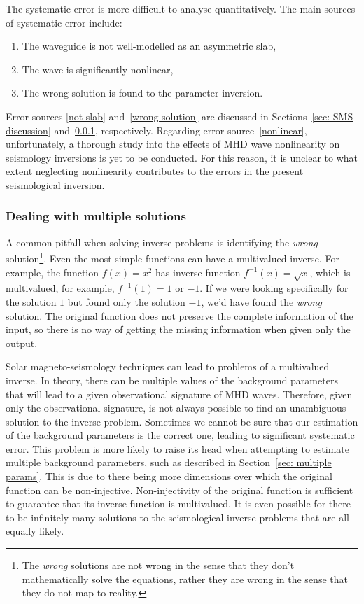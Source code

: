 The systematic error is more difficult to analyse quantitatively. The main sources of systematic error include:
\begin{enumerate}
	\item The waveguide is not well-modelled as an asymmetric slab, \label{not slab}
	\item The wave is significantly nonlinear, \label{nonlinear}
	\item The wrong solution is found to the parameter inversion. \label{wrong solution}
\end{enumerate}
Error sources \ref{not slab} and~\ref{wrong solution} are discussed in Sections~\ref{sec: SMS discussion} and~\ref{sec: multiple roots}, respectively. Regarding error source~\ref{nonlinear}, unfortunately, a thorough study into the effects of MHD wave nonlinearity on seismology inversions is yet to be conducted. For this reason, it is unclear to what extent neglecting nonlinearity contributes to the errors in the present seismological inversion.


\subsubsection{Dealing with multiple solutions} \label{sec: multiple roots}

A common pitfall when solving inverse problems is identifying the \textit{wrong} solution\footnote{The \textit{wrong} solutions are not wrong in the sense that they don't mathematically solve the equations, rather they are wrong in the sense that they do not map to reality.}. Even the most simple functions can have a multivalued inverse. For example, the function $f(x) = x^2$ has inverse function $f^{-1}(x) = \sqrt{x}$, which is multivalued, for example, $f^{-1}(1) = 1$ or $-1$. If we were looking specifically for the solution $1$ but found only the solution $-1$, we'd have found the \textit{wrong} solution. The original function does not preserve the complete information of the input, so there is no way of getting the missing information when given only the output.

Solar magneto-seismology techniques can lead to problems of a multivalued inverse. In theory, there can be multiple values of the background parameters that will lead to a given observational signature of MHD waves. Therefore, given only the observational signature, is not always possible to find an unambiguous solution to the inverse problem. Sometimes we cannot be sure that our estimation of the background parameters is the correct one, leading to significant systematic error. This problem is more likely to raise its head when attempting to estimate multiple background parameters, such as described in Section~\ref{sec: multiple params}. This is due to there being more dimensions over which the original function can be non-injective. Non-injectivity of the original function is sufficient to guarantee that its inverse function is multivalued. It is even possible for there to be infinitely many solutions to the seismological inverse problems that are all equally likely.

